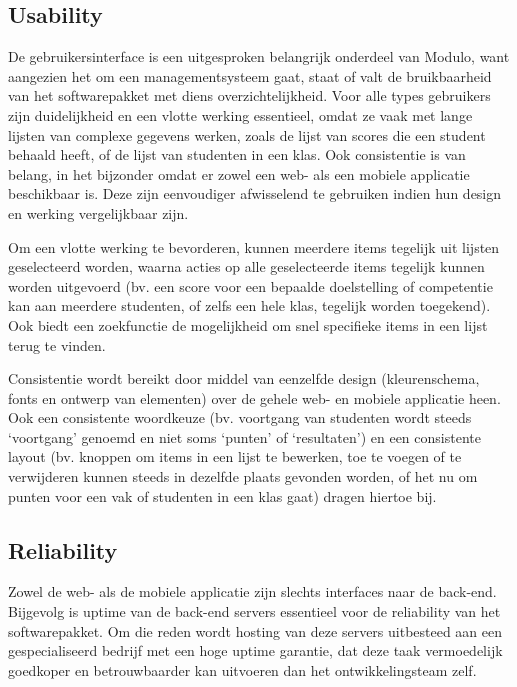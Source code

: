 \documentclass[a4paper]{article}
\begin{document}

\subsection{Usability}
De gebruikersinterface is een uitgesproken belangrijk onderdeel van Modulo, want aangezien het om een managementsysteem gaat, staat of valt de bruikbaarheid van het softwarepakket met diens overzichtelijkheid. Voor alle types gebruikers zijn duidelijkheid en een vlotte werking essentieel, omdat ze vaak met lange lijsten van complexe gegevens werken, zoals de lijst van scores die een student behaald heeft, of de lijst van studenten in een klas. Ook consistentie is van belang, in het bijzonder omdat er zowel een web- als een mobiele applicatie beschikbaar is. Deze zijn eenvoudiger afwisselend te gebruiken indien hun design en werking vergelijkbaar zijn.

Om een vlotte werking te bevorderen, kunnen meerdere items tegelijk uit lijsten geselecteerd worden, waarna acties op alle geselecteerde items tegelijk kunnen worden uitgevoerd (bv. een score voor een bepaalde doelstelling of competentie kan aan meerdere studenten, of zelfs een hele klas, tegelijk worden toegekend). Ook biedt een zoekfunctie de mogelijkheid om snel specifieke items in een lijst terug te vinden.

Consistentie wordt bereikt door middel van eenzelfde design (kleurenschema, fonts en ontwerp van elementen) over de gehele web- en mobiele applicatie heen. Ook een consistente woordkeuze (bv. voortgang van studenten wordt steeds `voortgang' genoemd en niet soms `punten' of `resultaten') en een consistente layout (bv. knoppen om items in een lijst te bewerken, toe te voegen of te verwijderen kunnen steeds in dezelfde plaats gevonden worden, of het nu om punten voor een vak of studenten in een klas gaat) dragen hiertoe bij.

\subsection{Reliability}
Zowel de web- als de mobiele applicatie zijn slechts interfaces naar de back-end. Bijgevolg is uptime van de back-end servers essentieel voor de reliability van het softwarepakket. Om die reden wordt hosting van deze servers uitbesteed aan een gespecialiseerd bedrijf met een hoge uptime garantie, dat deze taak vermoedelijk goedkoper en betrouwbaarder kan uitvoeren dan het ontwikkelingsteam zelf.
\end{document}
